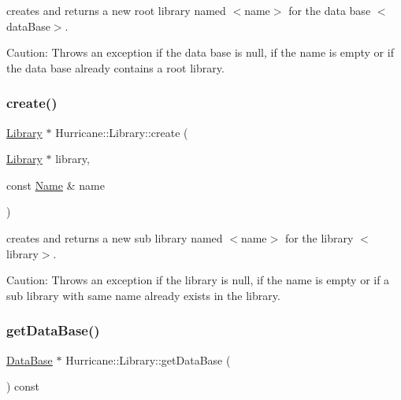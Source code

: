 creates and returns a new root library named {\ttfamily $<$name$>$} for the data base {\ttfamily $<$data\+Base$>$}.

\begin{DoxyParagraph}{Caution\+:}
Throws an exception if the data base is null, if the name is empty or if the data base already contains a root library. 
\end{DoxyParagraph}
\mbox{\label{classHurricane_1_1Library_a36bc1af0e48307180be81a81d462650e}} 
\subsubsection{\texorpdfstring{create()}{create()}\hspace{0.1cm}{\footnotesize\ttfamily [2/2]}}
{\footnotesize\ttfamily \hyperlink{classHurricane_1_1Library}{Library} $\ast$ Hurricane\+::\+Library\+::create (\begin{DoxyParamCaption}\item[{\hyperlink{classHurricane_1_1Library}{Library} $\ast$}]{library,  }\item[{const \hyperlink{classHurricane_1_1Name}{Name} \&}]{name }\end{DoxyParamCaption})\hspace{0.3cm}{\ttfamily [static]}}

creates and returns a new sub library named {\ttfamily $<$name$>$} for the library {\ttfamily $<$library$>$}.

\begin{DoxyParagraph}{Caution\+:}
Throws an exception if the library is null, if the name is empty or if a sub library with same name already exists in the library. 
\end{DoxyParagraph}
\mbox{\label{classHurricane_1_1Library_a657cbf1ac426ef6def0b5b51f80ed248}} 
\subsubsection{\texorpdfstring{get\+Data\+Base()}{getDataBase()}}
{\footnotesize\ttfamily \hyperlink{classHurricane_1_1DataBase}{Data\+Base} $\ast$ Hurricane\+::\+Library\+::get\+Data\+Base (\begin{DoxyParamCaption}{ }\end{DoxyParamCaption}) const\hspace{0.3cm}{\ttfamily [inline]}}

